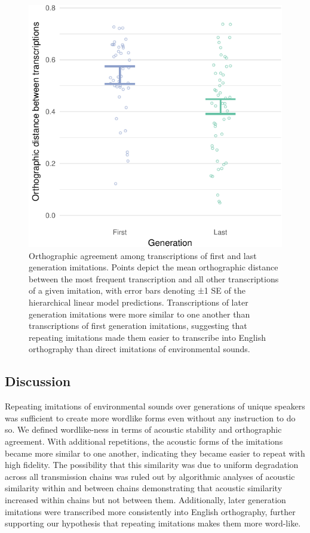 \documentclass[english,floatsintext,man]{apa6}
\theoremstyle{definition}
\theoremstyle{definition}
\theoremstyle{remark}
\begin{document}
\begin{figure}
\centering
\includegraphics{fig3-1.pdf}
\caption{\label{fig:fig3}Orthographic agreement among transcriptions of
first and last generation imitations. Points depict the mean
orthographic distance between the most frequent transcription and all
other transcriptions of a given imitation, with error bars denoting ±1
SE of the hierarchical linear model predictions. Transcriptions of later
generation imitations were more similar to one another than
transcriptions of first generation imitations, suggesting that repeating
imitations made them easier to transcribe into English orthography than
direct imitations of environmental sounds.}
\end{figure}

\subsection{Discussion}\label{discussion}

Repeating imitations of environmental sounds over generations of unique
speakers was sufficient to create more wordlike forms even without any
instruction to do so. We defined wordlike-ness in terms of acoustic
stability and orthographic agreement. With additional repetitions, the
acoustic forms of the imitations became more similar to one another,
indicating they became easier to repeat with high fidelity. The
possibility that this similarity was due to uniform degradation across
all transmission chains was ruled out by algorithmic analyses of
acoustic similarity within and between chains demonstrating that
acoustic similarity increased within chains but not between them.
Additionally, later generation imitations were transcribed more
consistently into English orthography, further supporting our hypothesis
that repeating imitations makes them more word-like.
\end{document}
